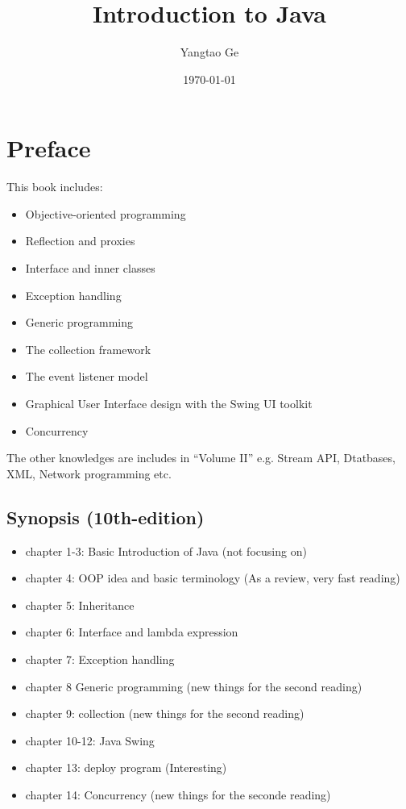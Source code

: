 \documentclass[12pt]{article}
\title{Introduction to Java}
\author{Yangtao Ge}
\date{\today}
\begin{document}
\maketitle
\section{Preface}
This book includes:
\begin{itemize}
    \item Objective-oriented programming
    \item Reflection and proxies
    \item Interface and inner classes
    \item Exception handling
    \item Generic programming
    \item The collection framework
    \item The event listener model
    \item Graphical User Interface design with the Swing UI toolkit
    \item Concurrency
\end{itemize}
The other knowledges are includes in ``Volume II'' e.g. Stream API, Dtatbases, XML, Network programming etc.

\subsection*{Synopsis (10th-edition)}
\begin{itemize}
    \item chapter 1-3: Basic Introduction of Java (not focusing on)
    \item chapter 4: OOP idea and basic terminology (As a review, very fast reading)
    \item chapter 5: Inheritance
    \item chapter 6: Interface and lambda expression
    \item chapter 7: Exception handling
    \item chapter 8 Generic programming (new things for the second reading)
    \item chapter 9: collection (new things for the second reading)
    \item chapter 10-12: Java Swing
    \item chapter 13: deploy program (Interesting)
    \item chapter 14: Concurrency (new things for the seconde reading)
\end{itemize}
\end{document}

